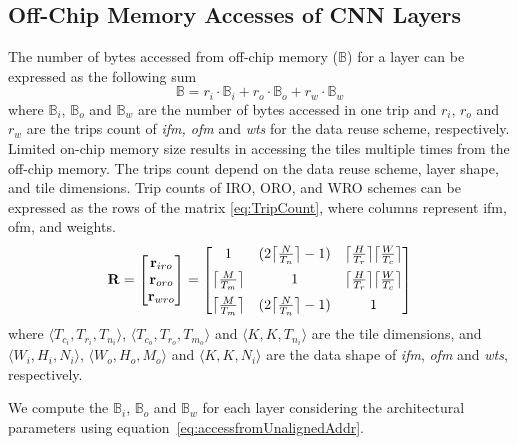 \documentclass[a4paper,10pt]{article}
\DeclarePairedDelimiter{\ceil}{\lceil}{\rceil}
\newcommand{\numBytesOffChip}{\mathbb{B}}
\begin{document}
\subsection{Off-Chip Memory Accesses of CNN Layers}
The number of bytes accessed from off-chip memory ($\numBytesOffChip$) for a layer can be expressed as the following sum
\begin{equation}\label{eq:TotalOffChipAccess}
	\numBytesOffChip{}={}{r_{i}}{\cdot}\numBytesOffChip_{i}{+}{r_{o}}{\cdot}\numBytesOffChip_{o}{+}{r_{w}}{\cdot}\numBytesOffChip_{w}
\end{equation}
where $\numBytesOffChip_{i}$, $\numBytesOffChip_{o}$ and $\numBytesOffChip_{w}$ are the number of bytes accessed in one trip and $r_{i}$, $r_{o}$ and $r_{w}$ are the trips count of \textit{ifm, ofm} and \textit{wts} for the data reuse scheme, respectively.  Limited on-chip memory size results in accessing the tiles multiple times from the off-chip memory.  The trips count depend on the data reuse scheme, layer shape, and tile dimensions. Trip counts of IRO, ORO, and WRO schemes can be expressed as the rows of the matrix \eqref{eq:TripCount}, where columns represent ifm, ofm, and weights.
\begin{align}\label{eq:TripCount}
	\mathbf{R}=
	\begin{bmatrix}
		\mathbf{r}_{iro} \\  \mathbf{r}_{oro} \\ \mathbf{r}_{wro} \\
	\end{bmatrix}= 
	\begin{bmatrix}
		1  & (2\ceil[\big]{\frac{N}{T_n}}-1) & \ceil[\big]{\frac{H}{T_r}} \ceil[\big]{\frac{W}{T_c}}\\[6pt]
		\ceil[\big]{\frac{M}{T_m}} & 1 & \ceil[\big]{\frac{H}{T_r}} \ceil[\big]{\frac{W}{T_c}}\\[6pt]
		\ceil[\big]{\frac{M}{T_m}} & (2\ceil[\big]{\frac{N}{T_n}}-1) & 1\\
	\end{bmatrix}
\end{align}
where $\langle T_{c_i},T_{r_i},T_{n_i}\rangle$, $\langle T_{c_o},T_{r_o},T_{m_o}\rangle$ and $\langle K,K,T_{n_i}\rangle$ are the tile dimensions, and $\langle W_i,H_i,N_i\rangle$, $\langle W_o,H_o,M_o\rangle$ and $\langle K,K,N_i\rangle$ are the data shape of \textit{ifm}, \textit{ofm} and \textit{wts}, respectively. 

We compute the $\numBytesOffChip_{i}$, $\numBytesOffChip_{o}$ and $\numBytesOffChip_{w}$ for each layer considering the architectural parameters using equation~\ref{eq:accessfromUnalignedAddr}.
\end{document}
